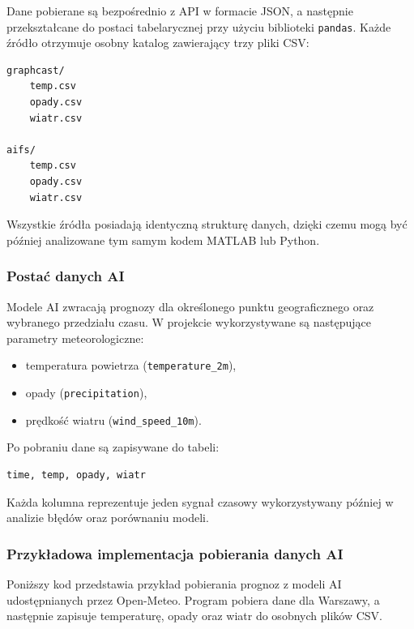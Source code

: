 \documentclass[a4paper,12pt]{article}
\begin{document}
\noindent
Dane pobierane są bezpośrednio z API w formacie JSON, a następnie
przekształcane do postaci tabelarycznej przy użyciu biblioteki
\texttt{pandas}. Każde źródło otrzymuje osobny katalog zawierający trzy
pliki CSV:
\begin{verbatim}
graphcast/
    temp.csv
    opady.csv
    wiatr.csv

aifs/
    temp.csv
    opady.csv
    wiatr.csv
\end{verbatim}

\noindent
Wszystkie źródła posiadają identyczną strukturę danych, dzięki czemu
mogą być później analizowane tym samym kodem MATLAB lub Python.
\newpage
\subsubsection{Postać danych AI}

Modele AI zwracają prognozy dla określonego punktu geograficznego oraz
wybranego przedziału czasu. W projekcie wykorzystywane są następujące
parametry meteorologiczne:
\begin{itemize}
    \item temperatura powietrza (\texttt{temperature\_2m}),
    \item opady (\texttt{precipitation}),
    \item prędkość wiatru (\texttt{wind\_speed\_10m}).
\end{itemize}

\noindent
Po pobraniu dane są zapisywane do tabeli:
\begin{verbatim}
time, temp, opady, wiatr
\end{verbatim}

\noindent
Każda kolumna reprezentuje jeden sygnał czasowy wykorzystywany później
w analizie błędów oraz porównaniu modeli.

\subsubsection{Przykładowa implementacja pobierania danych AI}

Poniższy kod przedstawia przykład pobierania prognoz z modeli AI
udostępnianych przez Open-Meteo. Program pobiera dane dla Warszawy,
a następnie zapisuje temperaturę, opady oraz wiatr do osobnych plików CSV.
\end{document}

